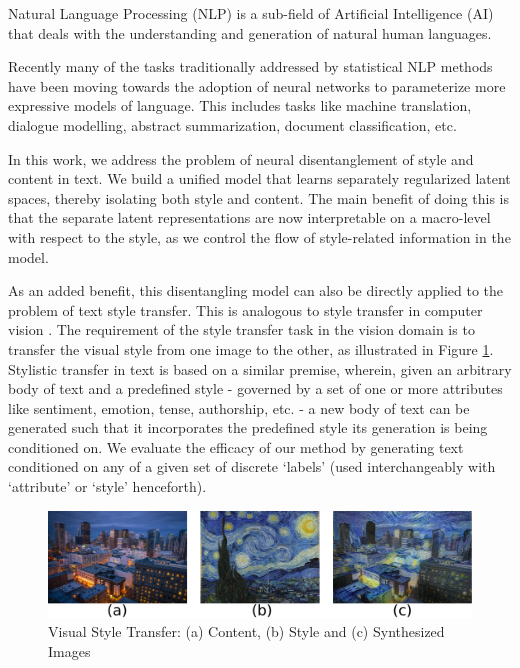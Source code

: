 Natural Language Processing (NLP) is a sub-field of Artificial Intelligence (AI) that deals with the understanding and generation of natural human languages.

Recently many of the tasks traditionally addressed by statistical NLP methods have been moving towards the adoption of neural networks to parameterize more expressive models of language. This includes tasks like machine translation, dialogue modelling, abstract summarization, document classification, etc.

In this work, we address the problem of neural disentanglement of style and content in text. We build a unified model that learns separately regularized latent spaces, thereby isolating both style and content. The main benefit of doing this is that the separate latent representations are now interpretable on a macro-level with respect to the style, as we control the flow of style-related information in the model.

As an added benefit, this disentangling model can also be directly applied to the problem of text style transfer. This is analogous to style transfer in computer vision \citep{gatys2016image}. The requirement of the style transfer task in the vision domain is to transfer the visual style from one image to the other, as illustrated in Figure \ref{fig:style-transfer-vision}. Stylistic transfer in text is based on a similar premise, wherein, given an arbitrary body of text and a predefined style - governed by a set of one or more attributes like sentiment, emotion, tense, authorship, etc. - a new body of text can be generated such that it incorporates the predefined style its generation is being conditioned on. We evaluate the efficacy of our method by generating text conditioned on any of a given set of discrete `labels' (used interchangeably with `attribute' or `style' henceforth).

\begin{figure}[ht]
	\centering
	\includegraphics[width=\textwidth]{images/style-transfer-vision}
	\caption{\label{fig:style-transfer-vision}Visual Style Transfer: (a) Content, (b) Style and (c) Synthesized Images}
\end{figure}


